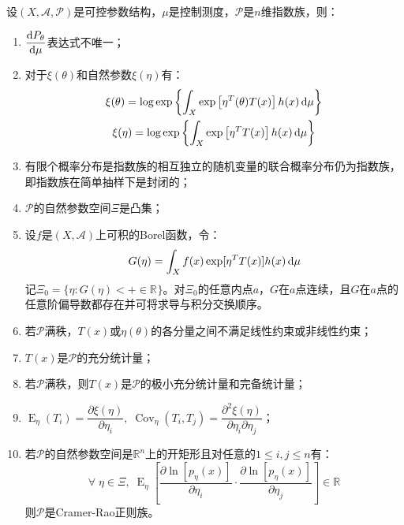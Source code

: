 \begin{property}\label{prop:ExponentialFamily}
	设$(X,\mathscr{A},\mathscr{P})$是可控参数结构，$\mu$是控制测度，$\mathscr{P}$是$n$维指数族，则：
	\begin{enumerate}
		\item $\dfrac{\mathop{}\!\mathrm{d} P_{\theta}}{\mathop{}\!\mathrm{d}\mu}$表达式不唯一；
		\item 对于$\xi(\theta)$和自然参数$\xi(\eta)$有：
		\begin{gather*}
			\xi(\theta)=\log\exp\left\{\int_{X}\exp\left[\eta^T(\theta)T(x)\right]h(x)\mathop{}\!\mathrm{d}\mu\right\} \\
			\xi(\eta)=\log\exp\left\{\int_{X}\exp\left[\eta^TT(x)\right]h(x)\mathop{}\!\mathrm{d}\mu\right\}
		\end{gather*}
		\item 有限个概率分布是指数族的相互独立的随机变量的联合概率分布仍为指数族，即指数族在简单抽样下是封闭的；
		\item $\mathscr{P}$的自然参数空间$\Xi$是凸集；
		\item 设$f$是$(X,\mathscr{A})$上可积的Borel函数，令：
		\begin{equation*}
			G(\eta)=\int_{X}f(x)\exp[\eta^TT(x)]h(x)\mathop{}\!\mathrm{d}\mu
		\end{equation*}
		记$\Xi_0=\{\eta:G(\eta)<+\in\mathbb{R}^{}\}$。对$\Xi_0$的任意内点$a$，$G$在$a$点连续，且$G$在$a$点的任意阶偏导数都存在并可将求导与积分交换顺序。
		\item 若$\mathscr{P}$满秩，$T(x)$或$\eta(\theta)$的各分量之间不满足线性约束或非线性约束；
		\item $T(x)$是$\mathscr{P}$的充分统计量；
		\item 若$\mathscr{P}$满秩，则$T(x)$是$\mathscr{P}$的极小充分统计量和完备统计量；
		\item $\operatorname{E}_{\eta}(T_i)=\dfrac{\partial\xi(\eta)}{\partial\eta_i},\;\operatorname{Cov}_{\eta}(T_i,T_j)=\dfrac{\partial^2\xi(\eta)}{\partial\eta_i\partial\eta_j}$；
		\item 若$\mathscr{P}$的自然参数空间是$\mathbb{R}^{n}$上的开矩形且对任意的$1\leqslant i,j\leqslant n$有：
		\begin{equation*}
			\forall\;\eta\in\Xi,\;\operatorname{E}_{\eta}\left[\frac{\partial\ln[p_{\eta}(x)]}{\partial\eta_i}\cdot\frac{\partial\ln[p_{\eta}(x)]}{\partial\eta_j}\right]\in\mathbb{R}^{}
		\end{equation*}
		则$\mathscr{P}$是Cramer-Rao正则族。
	\end{enumerate}
\end{property}
